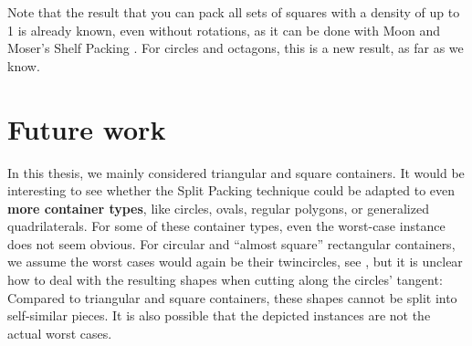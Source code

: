 \documentclass[a4paper,style=print,oneside,bibliography=totoc,nexus,lnum,extramargin]{tubsbook}
\begin{document}
Note that the result that you can pack all sets of squares with a density of up to 1 is already known, even without rotations, as it can be done with Moon and Moser's Shelf Packing \cite{MM1967some}. For circles and octagons, this is a new result, as far as we know.

%
%
%

\chapter{Future work}\label{ch:future-work}

%
%
%

In this thesis, we mainly considered triangular and square containers. It would be interesting to see whether the Split Packing technique could be adapted to even \textbf{more container types}, like circles, ovals, regular polygons, or generalized quadrilaterals. For some of these container types, even the worst-case instance does not seem obvious. For circular and “almost square” rectangular containers, we assume the worst cases would again be their twincircles, see , but it is unclear how to deal with the resulting shapes when cutting along the circles' tangent: Compared to triangular and square containers, these shapes cannot be split into self-similar pieces. It is also possible that the depicted instances are not the actual worst cases.

\end{document}
